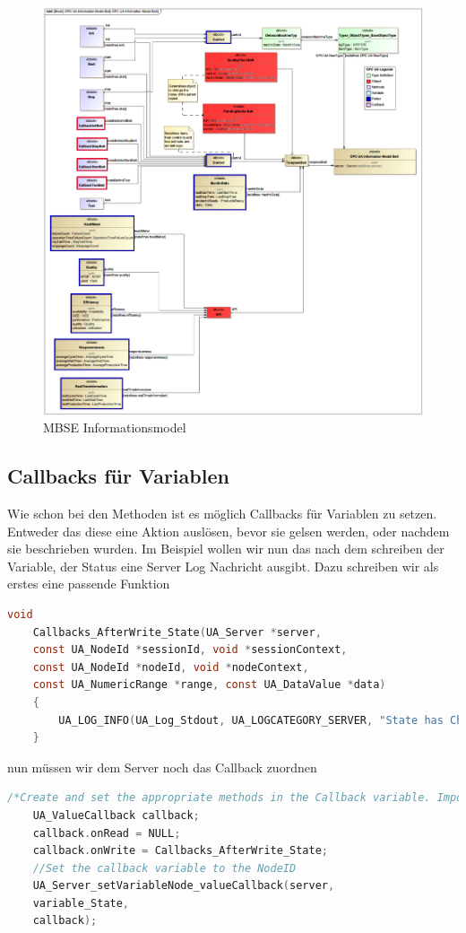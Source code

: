 \begin{figure}[H]
	\centering
	\includegraphics[width=1\linewidth]{"abb/konOPC UA Information Model Belt"}
	\caption{MBSE Informationsmodel}
	\label{fig:konopc-ua-information-model-belt}
\end{figure}

\subsection{Callbacks für Variablen}\label{sec:callbacks-fur-variablen}
Wie schon bei den Methoden ist es möglich Callbacks für Variablen zu setzen. Entweder das diese eine Aktion auslösen, bevor sie gelsen werden, oder nachdem sie beschrieben wurden.
Im Beispiel wollen wir nun das nach dem schreiben der Variable, der Status eine Server Log Nachricht ausgibt. Dazu schreiben wir als erstes eine passende Funktion 
\begin{lstlisting}[language=C]
	void 
	Callbacks_AfterWrite_State(UA_Server *server,
	const UA_NodeId *sessionId, void *sessionContext,
	const UA_NodeId *nodeId, void *nodeContext,
	const UA_NumericRange *range, const UA_DataValue *data)
	{
		UA_LOG_INFO(UA_Log_Stdout, UA_LOGCATEGORY_SERVER, "State has Changed");
	}        
\end{lstlisting}
nun müssen wir dem Server noch das Callback zuordnen
\begin{lstlisting}[language=C]
	/*Create and set the appropriate methods in the Callback variable. Important if you don't assign a function you have to set NULL, otherwise unexpected pointer errors can occur.*/
	UA_ValueCallback callback;
	callback.onRead = NULL;
	callback.onWrite = Callbacks_AfterWrite_State;
	//Set the callback variable to the NodeID
	UA_Server_setVariableNode_valueCallback(server, 
	variable_State,
	callback);
\end{lstlisting}

